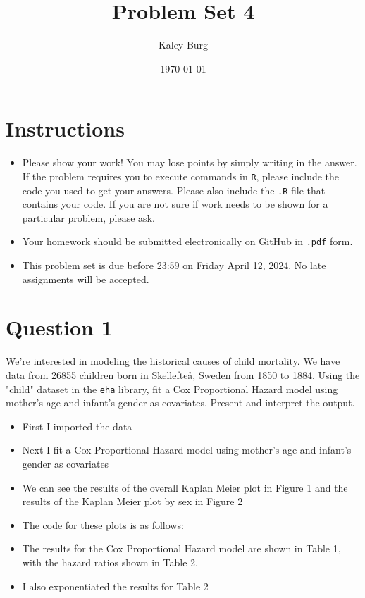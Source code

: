 \documentclass[12pt,letterpaper]{article}
\title{Problem Set 4}
\date{\today}
\author{Kaley Burg}
\begin{document}
	\maketitle
	\section*{Instructions}
	\begin{itemize}
	\item Please show your work! You may lose points by simply writing in the answer. If the problem requires you to execute commands in \texttt{R}, please include the code you used to get your answers. Please also include the \texttt{.R} file that contains your code. If you are not sure if work needs to be shown for a particular problem, please ask.
	\item Your homework should be submitted electronically on GitHub in \texttt{.pdf} form.
	\item This problem set is due before 23:59 on Friday April 12, 2024. No late assignments will be accepted.

	\end{itemize}

	\vspace{.25cm}
\section*{Question 1}
\vspace{.25cm}
\noindent We're interested in modeling the historical causes of child mortality. We have data from 26855 children born in Skellefteå, Sweden from 1850 to 1884. Using the "child" dataset in the \texttt{eha} library, fit a Cox Proportional Hazard model using mother's age and infant's gender as covariates. Present and interpret the output.



\begin{itemize}
	\item First I imported the data
	
	\item Next I fit a Cox Proportional Hazard model using mother's age and infant's gender as covariates
	
	\item We can see the results of the overall Kaplan Meier plot in Figure 1 and the results of the Kaplan Meier plot by sex in Figure 2
	\item The code for these plots is as follows:
	
	
	\item The results for the Cox Proportional Hazard model are shown in Table 1, with the hazard ratios shown in Table 2.
	\item I also exponentiated the results for Table 2
	
\end{itemize}
\end{document}
